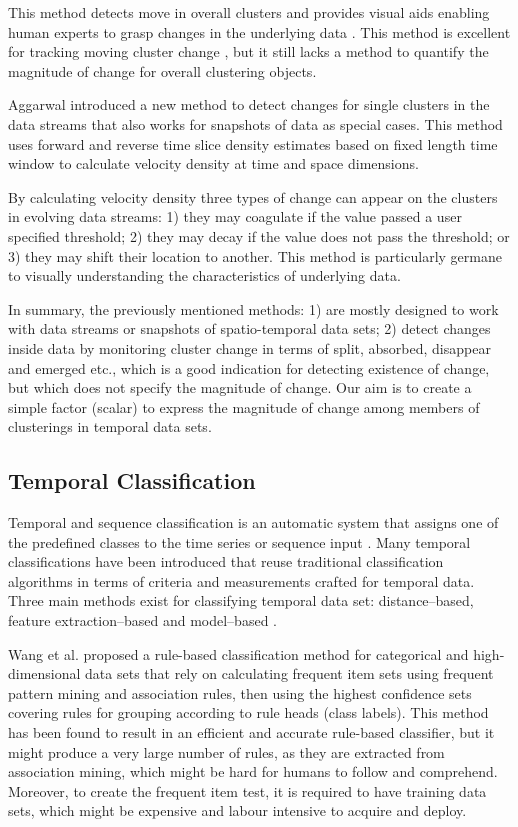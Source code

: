 This method detects move in overall clusters and provides visual aids enabling human experts to grasp changes in the underlying data \cite{Ntoutsi2011, Bottcher2008}. This method is excellent for tracking moving cluster change \cite{Ntoutsi2009} , but it still lacks a method to quantify the magnitude of change for overall clustering objects.




Aggarwal \cite{Aggarwal2005} introduced a new method to detect changes for single clusters in the data streams that also works for snapshots of data as special cases. This method uses forward and reverse time slice density estimates based on fixed length time window to calculate velocity density at time and space dimensions.

By calculating velocity density three types of change can appear on the clusters in evolving data streams: 1) they may coagulate if the value passed a user specified threshold; 2) they may decay if the value does not pass the threshold; or 3) they may shift their location to another. This method is particularly germane to visually understanding the characteristics of underlying data.


In summary, the previously mentioned methods: 1) are mostly designed to work with data streams or snapshots of spatio-temporal data sets; 2) detect changes inside data by monitoring cluster change in terms of split, absorbed, disappear and emerged etc., which is a good indication for detecting existence of change, but which does not specify the magnitude of change. Our aim is to create a simple factor (scalar) to express the magnitude of change among members of clusterings in temporal data sets.


\subsection{Temporal Classification}

Temporal and sequence classification is an automatic system that assigns one of the predefined classes to the time series or sequence input \cite{Laxman2006}. Many temporal classifications have been introduced that reuse traditional classification algorithms in terms of criteria and measurements crafted for temporal data. Three main methods exist for classifying temporal data set: distance--based, feature extraction--based and model--based \cite{Amr2009,Laxman2006}.

Wang et al. \cite{Wang2005} proposed a rule-based classification method for categorical and high-dimensional data sets that rely on calculating frequent item sets using frequent pattern mining and association rules, then using the highest confidence sets covering rules for grouping according to rule heads (class labels). This method has been found to result in an efficient and accurate rule-based classifier, but it might produce a very large number of rules, as they are extracted from association mining, which might be hard for humans to follow and comprehend. Moreover, to create the frequent item test, it is required to have training data sets, which might be expensive and labour intensive to acquire and deploy.


